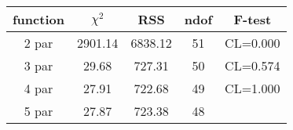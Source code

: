 \begin{tabular}{c|c|c|c|c}
function & $\chi^2$ & RSS & ndof & F-test \\
\hline
2 par & 2901.14 & 6838.12 & 51 & CL=0.000 \\
3 par & 29.68 & 727.31 & 50 & CL=0.574 \\
4 par & 27.91 & 722.68 & 49 & CL=1.000 \\
5 par & 27.87 & 723.38 & 48 & \\
\hline
\end{tabular}
